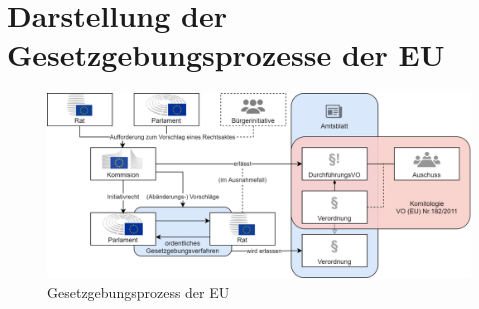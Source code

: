 
    \section{Darstellung der Gesetzgebungsprozesse der EU}
    
    \begin{figure}[h]
        \centering
        \includegraphics[width=\linewidth]{gfx/Gesegebungsprozess.png}
        \caption{Gesetzgebungsprozess der EU}
        \label{fig:europeg}
    \end{figure}
    